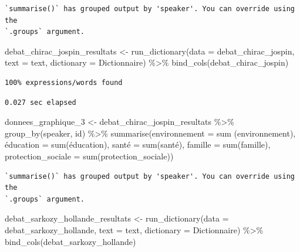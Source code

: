 \documentclass[
  letterpaper,
  DIV=11,
  numbers=noendperiod]{scrartcl}
\newenvironment{Shaded}{\begin{snugshade}}{\end{snugshade}}
\newcommand{\AttributeTok}[1]{\textcolor[rgb]{0.40,0.45,0.13}{#1}}
\newcommand{\FunctionTok}[1]{\textcolor[rgb]{0.28,0.35,0.67}{#1}}
\newcommand{\NormalTok}[1]{\textcolor[rgb]{0.00,0.23,0.31}{#1}}
\newcommand{\OtherTok}[1]{\textcolor[rgb]{0.00,0.23,0.31}{#1}}
\newcommand{\SpecialCharTok}[1]{\textcolor[rgb]{0.37,0.37,0.37}{#1}}
\begin{document}
\begin{verbatim}
`summarise()` has grouped output by 'speaker'. You can override using the
`.groups` argument.
\end{verbatim}

\begin{Shaded}
\begin{Highlighting}[]
\NormalTok{debat\_chirac\_jospin\_resultats }\OtherTok{\textless{}{-}} \FunctionTok{run\_dictionary}\NormalTok{(}\AttributeTok{data =}\NormalTok{ debat\_chirac\_jospin, }\AttributeTok{text =}\NormalTok{ text, }\AttributeTok{dictionary =}\NormalTok{ Dictionnaire) }\SpecialCharTok{\%\textgreater{}\%} \FunctionTok{bind\_cols}\NormalTok{(debat\_chirac\_jospin)}
\end{Highlighting}
\end{Shaded}

\begin{verbatim}
100% expressions/words found
\end{verbatim}

\begin{verbatim}
0.027 sec elapsed
\end{verbatim}

\begin{Shaded}
\begin{Highlighting}[]
\NormalTok{donnees\_graphique\_3 }\OtherTok{\textless{}{-}}\NormalTok{ debat\_chirac\_jospin\_resultats }\SpecialCharTok{\%\textgreater{}\%} \FunctionTok{group\_by}\NormalTok{(speaker, id) }\SpecialCharTok{\%\textgreater{}\%} \FunctionTok{summarise}\NormalTok{(}\AttributeTok{environnement =} \FunctionTok{sum}\NormalTok{ (environnement), é}\AttributeTok{ducation =} \FunctionTok{sum}\NormalTok{(éducation), santé }\OtherTok{=} \FunctionTok{sum}\NormalTok{(santé), }\AttributeTok{famille =} \FunctionTok{sum}\NormalTok{(famille), }\AttributeTok{protection\_sociale =} \FunctionTok{sum}\NormalTok{(protection\_sociale))}
\end{Highlighting}
\end{Shaded}

\begin{verbatim}
`summarise()` has grouped output by 'speaker'. You can override using the
`.groups` argument.
\end{verbatim}

\begin{Shaded}
\begin{Highlighting}[]
\NormalTok{debat\_sarkozy\_hollande\_resultats }\OtherTok{\textless{}{-}} \FunctionTok{run\_dictionary}\NormalTok{(}\AttributeTok{data =}\NormalTok{ debat\_sarkozy\_hollande, }\AttributeTok{text =}\NormalTok{ text, }\AttributeTok{dictionary =}\NormalTok{ Dictionnaire) }\SpecialCharTok{\%\textgreater{}\%} \FunctionTok{bind\_cols}\NormalTok{(debat\_sarkozy\_hollande)}
\end{Highlighting}
\end{Shaded}
\end{document}
